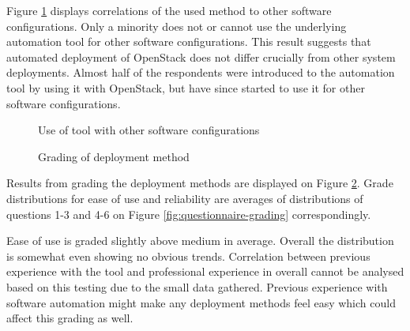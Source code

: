 \documentclass[officiallayout]{tktla}
\begin{document}
Figure \ref{fig:other-software-configurations} displays correlations of the
used method to other software configurations. Only a minority does not or
cannot use the underlying automation tool for other software configurations.
This result suggests that automated deployment of OpenStack does not differ
crucially from other system deployments. Almost half of the respondents were
introduced to the automation tool by using it with OpenStack, but have since
started to use it for other software configurations.

\begin{figure}[t]
\centering
{}
\caption{Use of tool with other software configurations}
\label{fig:other-software-configurations}
\end{figure}

\begin{figure}[t]
\centering
{}
\caption{Grading of deployment method}
\label{fig:method-grading}
\end{figure}

Results from grading the deployment methods are displayed on Figure
\ref{fig:method-grading}. Grade distributions for ease of use and reliability
are averages of distributions of questions 1-3 and 4-6 on Figure
\ref{fig:questionnaire-grading} correspondingly.

Ease of use is graded slightly above medium in average. Overall the
distribution is somewhat even showing no obvious trends. Correlation between
previous experience with the tool and professional experience in overall cannot
be analysed based on this testing due to the small data gathered. Previous
experience with software automation might make any deployment methods feel easy
which could affect this grading as well.
\end{document}
